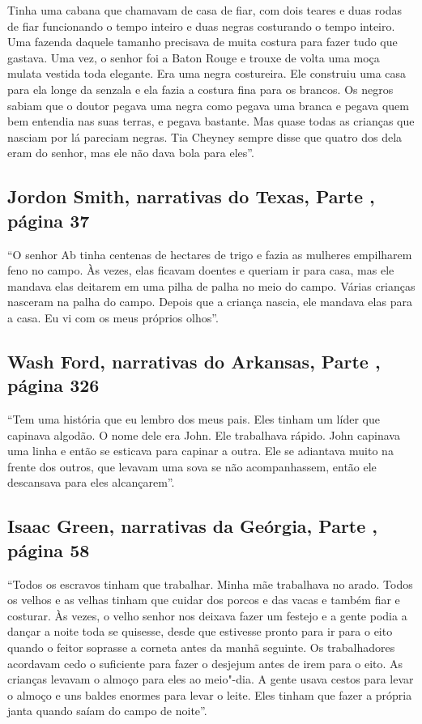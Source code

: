 Tinha uma cabana que chamavam de casa de fiar, com dois teares e duas
rodas de fiar funcionando o tempo inteiro e duas negras costurando o
tempo inteiro. Uma fazenda daquele tamanho precisava de muita costura
para fazer tudo que gastava. Uma vez, o senhor foi a Baton Rouge e
trouxe de volta uma moça mulata vestida toda elegante. Era uma negra
costureira. Ele construiu uma casa para ela longe da senzala e ela fazia
a costura fina para os brancos. Os negros sabiam que o doutor pegava uma
negra como pegava uma branca e pegava quem bem entendia nas suas terras,
e pegava bastante. Mas quase todas as crianças que nasciam por lá
pareciam negras. Tia Cheyney sempre disse que quatro dos dela eram do
senhor, mas ele não dava bola para eles''.

\subsection{Jordon Smith, narrativas do Texas, Parte , página 37}
\label{ref244}

``O senhor Ab tinha centenas de hectares de trigo e fazia as mulheres
empilharem feno no campo. Às vezes, elas ficavam doentes e queriam ir
para casa, mas ele mandava elas deitarem em uma pilha de palha no meio
do campo. Várias crianças nasceram na palha do campo. Depois que a
criança nascia, ele mandava elas para a casa. Eu vi com os meus próprios
olhos''.

\subsection{Wash Ford, narrativas do Arkansas, Parte , página 326} \label{ref92}

``Tem uma história que eu lembro dos meus pais. Eles tinham um líder que
capinava algodão. O nome dele era John. Ele trabalhava rápido. John
capinava uma linha e então se esticava para capinar a outra. Ele se
adiantava muito na frente dos outros, que levavam uma sova se não
acompanhassem, então ele descansava para eles alcançarem''.

\subsection{Isaac Green, narrativas da Geórgia, Parte , página 58}
\label{ref112}

``Todos os escravos tinham que trabalhar. Minha mãe trabalhava no arado.
Todos os velhos e as velhas tinham que cuidar dos porcos e das vacas e
também fiar e costurar. Às vezes, o velho senhor nos deixava fazer um
festejo e a gente podia a dançar a noite toda se quisesse, desde que %
estivesse pronto para ir para o eito quando o feitor soprasse a corneta
antes da manhã seguinte. Os trabalhadores acordavam cedo o suficiente
para fazer o desjejum antes de irem para o eito. As crianças levavam o
almoço para eles ao meio"-dia. A gente usava cestos para levar o almoço e
uns baldes enormes para levar o leite. Eles tinham que fazer a própria
janta quando saíam do campo de noite''.

